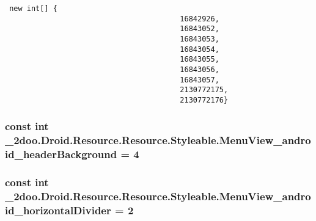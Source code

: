 \begin{Code}\begin{verbatim} new int[] {
                                        16842926,
                                        16843052,
                                        16843053,
                                        16843054,
                                        16843055,
                                        16843056,
                                        16843057,
                                        2130772175,
                                        2130772176}
\end{verbatim}
\end{Code}
\hypertarget{class__2doo_1_1_droid_1_1_resource_1_1_styleable_6db4bab13ff50ee34955695cb32a55bc}{
\subsubsection[{MenuView\_\-android\_\-headerBackground}]{\setlength{\rightskip}{0pt plus 5cm}const int \_\-2doo.Droid.Resource.Resource.Styleable.MenuView\_\-android\_\-headerBackground = 4}}
\label{class__2doo_1_1_droid_1_1_resource_1_1_styleable_6db4bab13ff50ee34955695cb32a55bc}


\hypertarget{class__2doo_1_1_droid_1_1_resource_1_1_styleable_43bdc250bdd7ed8b04f64b19098fd0fb}{
\subsubsection[{MenuView\_\-android\_\-horizontalDivider}]{\setlength{\rightskip}{0pt plus 5cm}const int \_\-2doo.Droid.Resource.Resource.Styleable.MenuView\_\-android\_\-horizontalDivider = 2}}
\label{class__2doo_1_1_droid_1_1_resource_1_1_styleable_43bdc250bdd7ed8b04f64b19098fd0fb}


